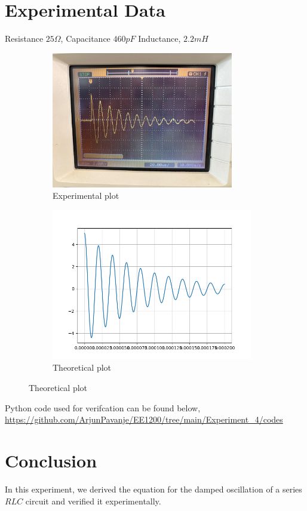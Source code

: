\documentclass[a4paper,12pt]{article}
\begin{document}
\section{Experimental Data}
Resistance $25\Omega$,\newline
Capacitance $460pF$\newline
Inductance, $2.2mH$
\begin{figure}[h!]
	\begin{subfigure}[b]{100pt}
		\caption{Experimental plot}
		\includegraphics[width = 225pt]{figs/fig1.png}
	\end{subfigure}
	\hspace{110pt}
	\begin{subfigure}[b]{100pt}
		\caption{Theoretical plot}
		\includegraphics[width = 250pt]{figs/fig2.png}
	\end{subfigure}
\end{figure}
\newline Python code used for verifcation can be found below,
\newline
\url{https://github.com/ArjunPavanje/EE1200/tree/main/Experiment_4/codes} 
\section{Conclusion}
In this experiment, we derived the equation for the damped oscillation of a series $RLC$ circuit and verified it experimentally.
\end{document}
